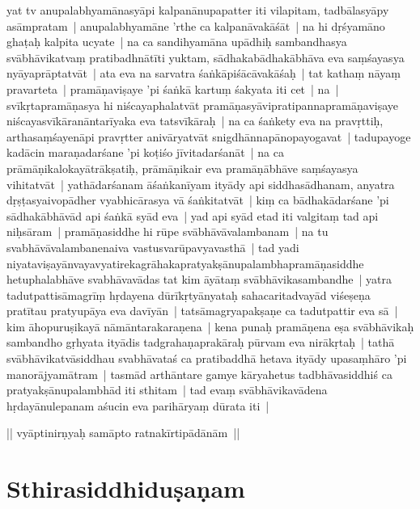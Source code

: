 \documentclass[article,a4paper]{memoir}
\begin{document}
	  \pstart yat tv anupalabhyamā\-nasyā\-pi kalpanā\-nupapatter iti vilapitam, tadbā\-lasyā\-py asā\-mpratam | anupalabhyamā\-ne 'rthe ca kalpanā\-vakā\-śā\-t | na hi dṛśyamā\-no ghaṭaḥ kalpita ucyate | na ca sandihyamā\-na upā\-dhiḥ sambandhasya svā\-bhā\-vikatvaṃ pratibadhnā\-tī\-ti yuktam, sā\-dhakabā\-dhakā\-bhā\-va eva saṃśayasya nyā\-yaprā\-ptatvā\-t | ata eva na sarvatra śaṅkā\-piśā\-cā\-vakā\-śaḥ | tat kathaṃ nā\-yaṃ pravarteta | \label{thakur75-111.9} pramā\-ṇaviṣaye 'pi śaṅkā\- kartuṃ śakyata iti cet | na | svī\-kṛtapramā\-ṇasya hi niścayaphalatvā\-t pramā\-ṇasyā\-vipratipannapramā\-ṇaviṣaye niścayasvī\-kā\-ranā\-ntarī\-yaka eva tatsvī\-kā\-raḥ | na ca śaṅkety eva na pravṛttiḥ, arthasaṃśayenā\-pi pravṛtter anivā\-ryatvā\-t snigdhā\-nnapā\-nopayogavat | tadupayoge kadā\-cin maraṇadarśane 'pi koṭiśo jī\-vitadarśanā\-t | na ca prā\-mā\-ṇikalokayā\-trā\-kṣatiḥ, prā\-mā\-ṇikair eva pramā\-ṇā\-bhā\-ve saṃśayasya vihitatvā\-t | yathā\-darśanam ā\-śaṅkanī\-yam ityā\-dy api siddhasā\-dhanam, anyatra dṛṣṭasyaivopā\-dher vyabhicā\-rasya vā\- śaṅkitatvā\-t | kiṃ ca bā\-dhakā\-darśane 'pi sā\-dhakā\-bhā\-vā\-d api śaṅkā\- syā\-d eva | \label{thakur75-111.17} yad api syā\-d etad iti valgitaṃ tad api niḥsā\-ram | pramā\-ṇasiddhe hi rū\-pe svā\-bhā\-vā\-valambanam | na tu svabhā\-vā\-valambanenaiva vastusvarū\-pavyavasthā\- | tad yadi niyataviṣayā\-nvayavyatirekagrā\-hakapratyakṣā\-nupalambhapramā\-ṇasiddhe hetuphalabhā\-ve svabhā\-vavā\-das tat kim ā\-yā\-taṃ svā\-bhā\-vikasambandhe | yatra tadutpattisā\-magrī\-ṃ hṛdayena dū\-rī\-kṛtyā\-nyataḥ sahacaritadvayā\-d viśeṣeṇa pratī\-tau pratyupā\-ya eva davī\-yā\-n | tatsā\-magryapakṣaṇe ca tadutpattir eva sā\- | kim ā\-hopuruṣikayā\- nā\-mā\-ntarakaraṇena | kena punaḥ pramā\-ṇena eṣa svā\-bhā\-vikaḥ sambandho gṛhyata ityā\-dis tadgrahaṇaprakā\-raḥ pū\-rvam eva nirā\-kṛtaḥ | tathā\- svā\-bhā\-vikatvā\-siddhau svabhā\-vataś ca pratibaddhā\- hetava ityā\-dy upasaṃhā\-ro 'pi manorā\-jyamā\-tram | tasmā\-d arthā\-ntare gamye kā\-ryahetus tadbhā\-vasiddhiś ca pratyakṣā\-nupalambhā\-d iti sthitam | tad evaṃ svā\-bhā\-vikavā\-dena hṛdayā\-nulepanam aśucin eva parihā\-ryaṃ dū\-rata iti |
	\pend
      

	  \pstart || vyā\-ptinirṇyaḥ samā\-pto ratnakī\-rtipā\-dā\-nā\-m || 
	\pend
      
	  
	
\section[{Sthirasiddhiduṣaṇam}]{Sthirasiddhiduṣaṇam}\label{Sthirasiddhiduṣaṇam}
\end{document}
